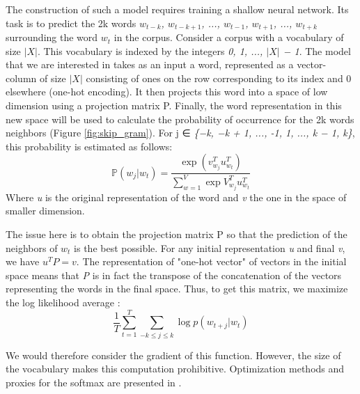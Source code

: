 \documentclass[12pt,a4paper]{article}
\begin{document}
The construction of such a model requires training a shallow neural network. Its task is to predict the 2k words \textit{$w_{t−k}$, $w_{t−k+1}$, ..., $w_{t−1}$, $w_{t+1}$, ..., $w_{t+k}$} surrounding the word $w_{t}$ in the corpus. Consider a corpus with a vocabulary of size $|X|$. This vocabulary is indexed by the integers \textit{0, 1, ..., $|X|$ − 1}. The model that we are interested in takes as an input a word, represented as a vector-column of size $|X|$ consisting of ones on the row corresponding to its index and 0 elsewhere (one-hot encoding). It then projects this word into a space of low dimension using a projection matrix P. Finally, the word representation in this new space will be used to calculate the probability of occurrence for the 2k words neighbors (Figure \ref{fig:skip_gram}). For j ∈ \textit{\{−k, −k + 1, ..., -1, 1, ..., k − 1, k\}}, this probability is estimated as follows:
\[\mathbb{P} (w_j \vert w_t) = \frac{\exp{({v^T_{w_j}} u^T_{w_t})}}{\sum_{w=1}^V \exp{V^T_{w_j}}u^T_{w_t}}\]
Where \textit{u} is the original representation of the word and \textit{v} the one in the space of smaller dimension.

The issue here is to obtain the projection matrix P so that the prediction of the neighbors of $w_{t}$ is the best possible. For any initial representation \textit{u} and final \textit{v}, we have $u^{T}P = v$. The representation of "one-hot vector" of vectors in the initial space means that \textit{P} is in fact the transpose of the concatenation of the vectors representing the words in the final space. Thus, to get this matrix, we maximize the log likelihood average :
\[\frac{1}{T} \sum_{t=1}^T \sum_{-k\leq j\leq k} \log p (w_{t+j} \vert w_t)\]

We would therefore consider the gradient of this function. However, the size of the vocabulary makes this computation prohibitive. Optimization methods and proxies for the softmax are presented in \cite{mikolov_dean}.
\end{document}
